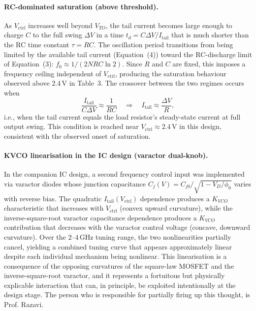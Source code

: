 \documentclass[11pt]{article}
\begin{document}
\paragraph{RC-dominated saturation (above threshold).}
As $V_{\mathrm{ctrl}}$ increases well beyond $V_{TO}$, the tail current becomes
large enough to charge $C$ to the full swing $\Delta V$ in a time
$t_d = C\Delta V / I_{\mathrm{tail}}$ that is much shorter than the RC time
constant $\tau = RC$. The oscillation period transitions from being limited by
the available tail current (Equation~(4)) toward the RC-discharge limit of
Equation~(3): $f_0 \approx 1/(2NRC\ln 2)$. Since $R$ and $C$ are fixed, this
imposes a frequency ceiling independent of $V_{\mathrm{ctrl}}$, producing
the saturation behaviour observed above $2.4\,\mathrm{V}$ in Table~3. The
crossover between the two regimes occurs when
%
\begin{equation}
    \frac{I_{\mathrm{tail}}}{C \Delta V} \approx \frac{1}{RC}
    \quad \Longrightarrow \quad
    I_{\mathrm{tail}} \approx \frac{\Delta V}{R},
\end{equation}
%
i.e., when the tail current equals the load resistor's steady-state current at
full output swing. This condition is reached near $V_{\mathrm{ctrl}} \approx 2.4\,\mathrm{V}$
in this design, consistent with the observed onset of saturation.
 
\paragraph{KVCO linearisation in the IC design (varactor dual-knob).}
In the companion IC design, a second frequency control input was implemented via
varactor diodes whose junction capacitance
$C_j(V) = C_{j0}/\sqrt{1 - V_D/\phi_0}$
varies with reverse bias.
The quadratic $I_{\mathrm{tail}}(V_{\mathrm{ctrl}})$ dependence produces a
$K_{VCO}$ characteristic that increases with $V_{\mathrm{ctrl}}$ (convex
upward curvature), while the inverse-square-root varactor capacitance dependence
produces a $K_{VCO}$ contribution that decreases with the varactor control voltage
(concave, downward curvature). Over the $2$--$4\,\mathrm{GHz}$ tuning range,
the two nonlinearities partially cancel, yielding a combined tuning curve that
appears approximately linear despite each individual mechanism being nonlinear.
This linearisation is a consequence of the opposing curvatures of the
square-law MOSFET and the inverse-square-root varactor, and it represents a
fortuitous but physically explicable interaction that can, in principle, be
exploited intentionally at the design stage.
The person who is responsible for partially firing up this thought, is Prof. Razavi.
\end{document}
